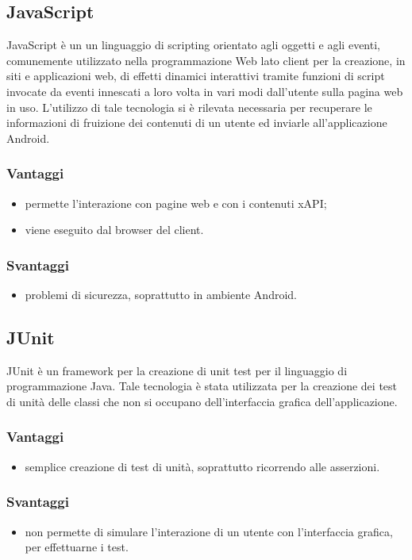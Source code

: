 \documentclass[../Tesi.tex]{subfiles}
\begin{document}
	\subsection{JavaScript}
		JavaScript è un un linguaggio di scripting orientato agli oggetti e agli eventi, comunemente utilizzato nella programmazione Web lato client per la creazione, in siti e applicazioni web, di effetti dinamici interattivi tramite funzioni di script invocate da eventi innescati a loro volta in vari modi dall'utente sulla pagina web in uso. L'utilizzo di tale tecnologia si è rilevata necessaria per recuperare le informazioni di fruizione dei contenuti di un utente ed inviarle all'applicazione Android. 
		\subsubsection{Vantaggi}
			\begin{itemize}
				\item permette l'interazione con pagine web e con i contenuti xAPI;
				\item viene eseguito dal browser del client.
			\end{itemize}
		\subsubsection{Svantaggi}
			\begin{itemize}
				\item problemi di sicurezza, soprattutto in ambiente Android.
			\end{itemize}

	\subsection{JUnit}
		JUnit è un framework per la creazione di unit test per il linguaggio di programmazione Java. Tale tecnologia è stata utilizzata per la creazione dei test di unità delle classi che non si occupano dell'interfaccia grafica dell'applicazione.
		\subsubsection{Vantaggi}
			\begin{itemize}
				\item semplice creazione di test di unità, soprattutto ricorrendo alle asserzioni.
			\end{itemize}
		\subsubsection{Svantaggi}
			\begin{itemize}
				\item non permette di simulare l'interazione di un utente con l'interfaccia grafica, per effettuarne i test.
			\end{itemize}
\end{document}
